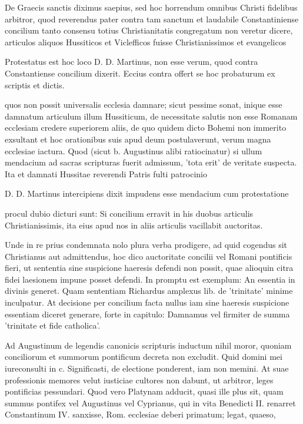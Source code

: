 De Graecis sanctis diximus saepius, sed hoc horrendum omnibus Christi fidelibus arbitror, quod reverendus pater contra tam sanctum et laudabile Constantiniense concilium tanto consensu totius Christianitatis congregatum non veretur dicere, articulos aliquos Hussiticos et Viclefficos fuisse Christianissimos et evangelicos

Protestatus est hoc loco D. D. Martinus, non esse verum, quod contra Constantiense concilium dixerit. Eccius contra offert se hoc probaturum ex scriptis et dictis.

quos non possit universalis ecclesia damnare; sicut pessime sonat, inique esse damnatum articulum illum Hussiticum, de necessitate salutis non esse Romanam ecclesiam credere superiorem aliis, de quo quidem dicto Bohemi non immerito exsultant et hoc orationibus suis apud deum postulaverunt, verum magna ecclesiae iactura. Quod (sicut b. Augustinus alibi ratiocinatur) si ullum mendacium ad sacras scripturas fuerit admissum, 'tota erit' de veritate suspecta. Ita et damnati Hussitae reverendi Patris fulti patrocinio

D. D. Martinus intercipiens dixit impudens esse mendacium cum protestatione

procul dubio \marginpar{\small[284]} dicturi sunt: Si concilium erravit in his duobus articulis Christianissimis, ita eius apud nos in aliis articulis vacillabit auctoritas.

Unde in re prius condemnata nolo plura verba prodigere, ad quid cogendus sit Christianus aut admittendus, hoc dico auctoritate concilii vel Romani pontificis fieri, ut sententia sine suspicione haeresis defendi non possit, quae alioquin citra fidei laesionem impune posset defendi. In promptu est exemplum: An essentia in divinis generet. Quam sententiam Richardus amplexus lib. de 'trinitate' minime inculpatur. At decisione per concilium facta nullus iam sine haeresis suspicione essentiam diceret generare, forte in capitulo: Damnamus vel firmiter de summa 'trinitate et fide catholica'.

Ad Augustinum de legendis canonicis scripturis inductum nihil moror, quoniam conciliorum et summorum pontificum decreta non excludit. Quid domini mei iureconsulti in c. Significasti, de electione ponderent, iam non memini. At suae professionis memores velut iusticiae cultores non dabunt, ut arbitror, leges pontificias pessundari. Quod vero Platynam adducit, quasi ille plus sit, quam summus pontifex vel Augustinus vel Cyprianus, qui in vita Benedicti II. renarret Constantinum IV. sanxisse, Rom. ecclesiae deberi primatum; legat, quaeso,

